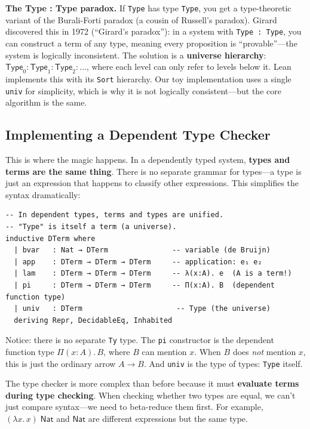 \documentclass[11pt,a4paper]{article}
\theoremstyle{definition}
\newcommand{\lam}{\lambda}
\begin{document}
\textbf{The Type : Type paradox.} If \texttt{Type} has type \texttt{Type}, you
get a type-theoretic variant of the Burali-Forti paradox (a cousin of
Russell's paradox). Girard discovered this in 1972 (``Girard's
paradox''): in a system with \texttt{Type : Type}, you can construct a term of
any type, meaning every proposition is ``provable''---the system is logically
inconsistent. The solution is a \textbf{universe hierarchy}: $\textsf{Type}_0 :
\textsf{Type}_1 : \textsf{Type}_2 : \ldots$, where each level can only refer
to levels below it. Lean implements this with its \texttt{Sort} hierarchy. Our
toy implementation uses a single \texttt{univ} for simplicity, which is why it
is not logically consistent---but the core algorithm is the same.

\subsection{Implementing a Dependent Type Checker}

This is where the magic happens. In a dependently typed system, \textbf{types
and terms are the same thing}. There is no separate grammar for types---a type
is just an expression that happens to classify other expressions. This
simplifies the syntax dramatically:

\begin{verbatim}
-- In dependent types, terms and types are unified.
-- "Type" is itself a term (a universe).
inductive DTerm where
  | bvar   : Nat → DTerm               -- variable (de Bruijn)
  | app    : DTerm → DTerm → DTerm     -- application: e₁ e₂
  | lam    : DTerm → DTerm → DTerm     -- λ(x:A). e  (A is a term!)
  | pi     : DTerm → DTerm → DTerm     -- Π(x:A). B  (dependent function type)
  | univ   : DTerm                      -- Type (the universe)
  deriving Repr, DecidableEq, Inhabited
\end{verbatim}

Notice: there is no separate \texttt{Ty} type. The \texttt{pi} constructor is
the dependent function type $\Pi(x{:}A).\, B$, where $B$ can mention $x$. When
$B$ does \emph{not} mention $x$, this is just the ordinary arrow $A \to B$. And
\texttt{univ} is the type of types: \texttt{Type} itself.

The type checker is more complex than before because it must \textbf{evaluate
terms during type checking}. When checking whether two types are equal, we
can't just compare syntax---we need to beta-reduce them first. For example,
$(\lam x.\, x)\;\textsf{Nat}$ and $\textsf{Nat}$ are different expressions
but the same type.
\end{document}
